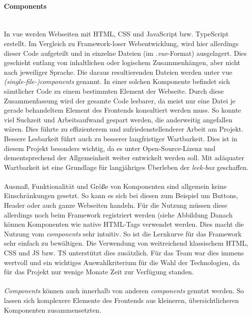 \documentclass[10pt, a4paper]{article}
\begin{document}
\paragraph*{Components} $~$ \\
In vue werden Webseiten mit HTML, CSS und JavaScript bzw. TypeScript erstellt.
Im Vergleich zu Framework-loser Webentwicklung, wird hier allerdings dieser Code aufgeteilt
 und in einzelne Dateien (im \textit{.vue}-Format) ausgelagert.
Dies geschieht entlang von inhaltlichen oder logischem Zusammenhängen, aber nicht nach jeweiliger Sprache.
Die daraus resultierenden Dateien werden unter vue \textit{(single-file-)components} genannt.
In einer solchen Komponente befindet sich sämtlicher Code zu einem bestimmten Element der Webseite.
Durch diese Zusammenfassung wird der gesamte Code lesbarer,
 da meist nur eine Datei je gerade behandeltem Element des Frontends konsultiert werden muss.
So konnte viel Suchzeit und Arbeitsaufwand gespart werden, die anderweitig angefallen wären.
Dies führte zu effizienterem und zufriedenstellenderer Arbeit am Projekt.
Bessere Lesbarkeit führt auch zu besserer langfristiger Wartbarkeit.
Dies ist in diesem Projekt besonders wichtig,
 da es unter Open-Source-Lizenz und dementsprechend der Allgemeinheit weiter entwickelt werden soll.
Mit adäquater Wartbarkeit ist eine Grundlage für langjähriges Überleben der \textit{leek-box} geschaffen.
\\~\\
Ausmaß, Funktionalität und Größe von Komponenten sind allgemein keine Einschränkungen gesetzt.
So kann es sich bei diesen zum Beispiel um Buttons, Header oder auch ganze Webseiten handeln.
Für die Nutzung müssen diese allerdings noch beim Framework registriert werden
(siehe Abbildung %
Danach können Komponenten wie native HTML-Tags verwendet werden.
Dies macht die Nutzung vom \textit{components} sehr intuitiv.
So ist die Lernkurve für das Framework sehr einfach zu bewältigen.
Die Verwendung von weitreichend klassischem HTML, CSS und JS bzw. TS unterstützt dies zusätzlich.
Für das Team war dies immens wertvoll und ein wichtiges Auswahlkriterium für die Wahl der Technologien,
 da für das Projekt nur wenige Monate Zeit zur Verfügung standen.
\\~\\
\textit{Components} können auch innerhalb von anderen \textit{components} genutzt werden.
So lassen sich komplexere Elemente des Frontends aus kleineren, übersichtlicheren Komponenten zusammensetzten.
\end{document}
